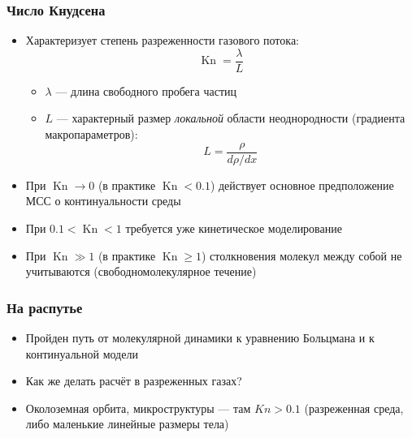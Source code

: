 \documentclass[onlymath]{beamer}
\renewcommand\geq\geqslant
\DeclareMathOperator\Kn{Kn}
\begin{document}
\begin{frame}
  \frametitle{Число Кнудсена}

  \begin{itemize}
  \item Характеризует степень разреженности газового потока:
    \begin{equation*}
      \Kn = \frac{\lambda}{L}
    \end{equation*}
    \begin{itemize}
    \item $\lambda$ — длина свободного пробега частиц
    \item $L$ — характерный размер \emph{локальной} области
      неоднородности (градиента макропараметров):
      \begin{equation*}
        L = \frac{\rho}{d\rho / dx}
      \end{equation*}
    \end{itemize}

  \item При $\Kn \to 0$ (в практике $\Kn < 0.1$) действует основное
    предположение МСС о континуальности среды
  \item При $0.1 < \Kn < 1$ требуется уже кинетическое моделирование
  \item При $\Kn \gg 1$ (в практике $\Kn \geq 1$) столкновения молекул
    между собой не учитываются (свободномолекулярное течение)
  \end{itemize}
\end{frame}

\begin{frame}
  \frametitle{На распутье}
  \begin{itemize}
  \item Пройден путь от молекулярной динамики к уравнению Больцмана и
    к континуальной модели
  \item Как же делать расчёт в разреженных газах?
  \item Околоземная орбита, микроструктуры — там $Kn > 0.1$
    (разреженная среда, либо маленькие линейные размеры тела)
  \end{itemize}
\end{frame}
\end{document}
